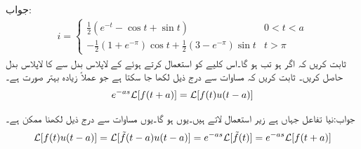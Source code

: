 جواب:
\begin{align*}
i=
\begin{cases}
\tfrac{1}{2}(e^{-t}-\cos t+\sin t) & 0<t<a\\
-\tfrac{1}{2}(1+e^{-\pi})\cos t+\tfrac{1}{2}(3-e^{-\pi})\sin t& t>\pi
\end{cases}
\end{align*}
ثابت کریں کہ اگر  ہو تب  ہو گا۔اس کلیے کو استعمال کرتے ہوئے  کے لاپلاس بدل سے  کا لاپلاس بدل حاصل کریں۔
ثابت کریں کہ مساوات  سے درج ذیل لکھا جا سکتا ہے جو عملاً زیادہ بہتر صورت ہے۔
\begin{align}
e^{-as}\mathcal{L}[f(t+a)]=\mathcal{L}[f(t)u(t-a)]
\end{align}

جواب:نیا تفاعل  جہاں  ہے زیر استعمال لاتے ہیں۔یوں  ہو گا۔یوں مساوات  سے درج ذیل لکھنا ممکن ہے۔
\begin{align*}
\mathcal{L}[f(t)u(t-a)]=\mathcal{L}[\tilde{f}(t-a)u(t-a)]=e^{-as}\mathcal{L}[\tilde{f}(t)]=e^{-as}\mathcal{L}[f(t+a)]
\end{align*}

